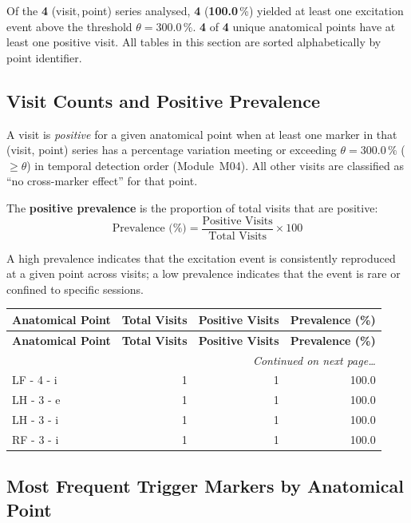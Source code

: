 \documentclass[a4paper,11pt]{article}
\begin{document}
\noindent
Of the \textbf{4} (visit,\,point) series analysed,
\textbf{4} (\textbf{100.0}\,\%) yielded at least one
excitation event above the threshold $\theta = 300.0\,\%$.
\textbf{4} of \textbf{4} unique anatomical points
have at least one positive visit.
All tables in this section are sorted alphabetically by point identifier.

\subsection{Visit Counts and Positive Prevalence}

A visit is \emph{positive} for a given anatomical point when at least one marker in that
(visit, point) series has a percentage variation meeting or exceeding
$\theta = 300.0\,\%$ ($\geq \theta$) in temporal detection order (Module~M04).
All other visits are classified as ``no cross-marker effect'' for that point.

The \textbf{positive prevalence} is the proportion of total visits that are positive:
\[
  \text{Prevalence (\%)} = \frac{\text{Positive Visits}}{\text{Total Visits}} \times 100
\]

A high prevalence indicates that the excitation event is consistently reproduced at a given
point across visits; a low prevalence indicates that the event is rare or confined to
specific sessions.

\begin{small}
\begin{longtable}{p{5cm}rrr}
\toprule
\textbf{Anatomical Point} &
\textbf{Total Visits} &
\textbf{Positive Visits} &
\textbf{Prevalence (\%)} \\
\midrule
\endfirsthead
\toprule
\textbf{Anatomical Point} &
\textbf{Total Visits} &
\textbf{Positive Visits} &
\textbf{Prevalence (\%)} \\
\midrule
\endhead
\midrule
\multicolumn{4}{r}{\small\emph{Continued on next page\ldots}} \\
\endfoot
\bottomrule
\endlastfoot
LF - 4 - i & 1 & 1 & 100.0 \\
LH - 3 - e & 1 & 1 & 100.0 \\
LH - 3 - i & 1 & 1 & 100.0 \\
RF - 3 - i & 1 & 1 & 100.0 \\
\end{longtable}
\end{small}

\subsection{Most Frequent Trigger Markers by Anatomical Point}
\end{document}
